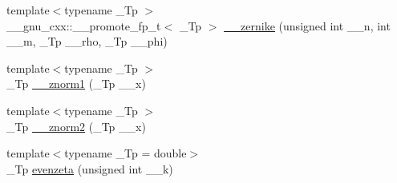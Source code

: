 \begin{DoxyCompactItemize}
{\footnotesize template$<$typename \+\_\+\+Tp $>$ }\\\+\_\+\+\_\+gnu\+\_\+cxx\+::\+\_\+\+\_\+promote\+\_\+fp\+\_\+t$<$ \+\_\+\+Tp $>$ \hyperlink{namespacestd_1_1____detail_aa09d6c12ea20927f2ea5f7a1ba2f8319}{\+\_\+\+\_\+zernike} (unsigned int \+\_\+\+\_\+n, int \+\_\+\+\_\+m, \+\_\+\+Tp \+\_\+\+\_\+rho, \+\_\+\+Tp \+\_\+\+\_\+phi)
\item 
{\footnotesize template$<$typename \+\_\+\+Tp $>$ }\\\+\_\+\+Tp \hyperlink{namespacestd_1_1____detail_a6827b123253cc6a19947406339738bd7}{\+\_\+\+\_\+znorm1} (\+\_\+\+Tp \+\_\+\+\_\+x)
\item 
{\footnotesize template$<$typename \+\_\+\+Tp $>$ }\\\+\_\+\+Tp \hyperlink{namespacestd_1_1____detail_adf930b70ca943c6810ac7d2ea78d2cc3}{\+\_\+\+\_\+znorm2} (\+\_\+\+Tp \+\_\+\+\_\+x)
\item 
{\footnotesize template$<$typename \+\_\+\+Tp  = double$>$ }\\\+\_\+\+Tp \hyperlink{namespacestd_1_1____detail_af59bd2be508cc6a421ddf5dd70c93d97}{evenzeta} (unsigned int \+\_\+\+\_\+k)
\end{DoxyCompactItemize}
